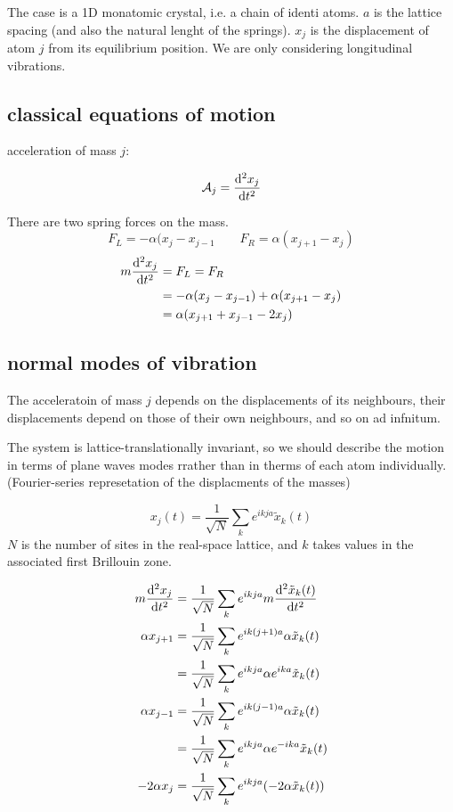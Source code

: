 \documentclass[10pt, a4paper, twocolumn]{article}
\begin{document}
The case is a 1D monatomic crystal, i.e. a chain of identi atoms. $a$ is the lattice spacing (and also the natural lenght of the springs). $x_j$ is the displacement of atom $j$ from its equilibrium position. We are only considering longitudinal vibrations.

\subsection{classical equations of motion}

acceleration of mass $j$:

\[\mathcal A_j=\dv[2]{x_j}{t}\]

There are two spring forces on the mass.
\[F_L=-\alpha (x_j-x_{j-1}
\qquad F_R=\alpha (x_{j+1}-x_j)\]
\begin{equation*}
\begin{aligned}
m\dv[2]{x_j}{t} &=F_L=F_R
\\&=-\alpha(x_j-x_{j-1})+\alpha (x_{j+1}-x_j)
\\&=\alpha (x_{j+1} +x_{j-1}-2x_j)
\end{aligned}
\end{equation*}

\subsection{normal modes of vibration}

The acceleratoin of mass $j$ depends  on the displacements of its neighbours, their displacements depend on those of their own neighbours, and so on ad infnitum.

The system is lattice-translationally invariant, so we should describe the motion in terms of plane waves modes rrather than in therms of each atom individually. (Fourier-series represetation of the displacments of the masses)

\[x_j(t)=\frac{1}{\sqrt N}\sum _ke^{ikja}\tilde x_k(t)\]
$N$ is the number of sites in the real-space lattice, and $k$ takes values in the associated first Brillouin zone.

\begin{equation*} 
\begin{aligned}
m\dv[2]{x_j}{t}&=\frac{1}{\sqrt N}
\sum _ke^{ikja}m\dv[2]{\tilde x_k(t)}{t}
\\\alpha x_{j+1}&=\frac{1}{\sqrt N}
\sum _ke^{ik(j+1)a}\alpha \tilde x_k(t)
\\&=\frac{1}{\sqrt N} \sum _ke^{ikja}\alpha
e^{ika}\tilde x_k(t)
\\\alpha x_{j-1}&=\frac{1}{\sqrt N}
\sum _ke^{ik(j-1)a}\alpha \tilde x_k(t)
\\&=\frac{1}{\sqrt N} \sum _ke^{ikja}\alpha
e^{-ika}\tilde x_k(t)
\\ -2\alpha x_j&=\frac{1}{\sqrt N} \sum _k
e^{ikja}(-2\alpha \tilde x_k(t))
\end{aligned}
\end{equation*}
\end{document}
